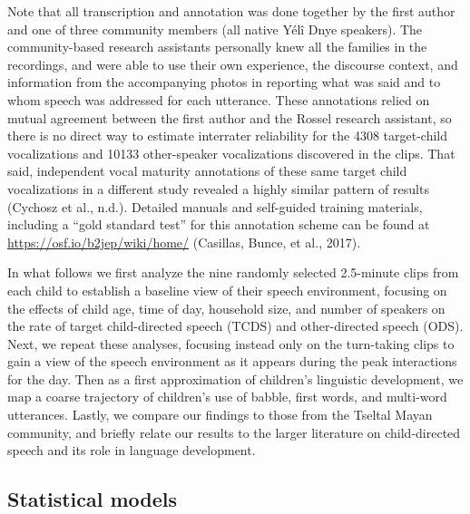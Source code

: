 \documentclass[
  english,
  ,man,floatsintext]{apa6}
\begin{document}
Note that all transcription and annotation was done together by the first author and one of three community members (all native Yélî Dnye speakers). The community-based research assistants personally knew all the families in the recordings, and were able to use their own experience, the discourse context, and information from the accompanying photos in reporting what was said and to whom speech was addressed for each utterance. These annotations relied on mutual agreement between the first author and the Rossel research assistant, so there is no direct way to estimate interrater reliability for the 4308 target-child vocalizations and 10133 other-speaker vocalizations discovered in the clips. That said, independent vocal maturity annotations of these same target child vocalizations in a different study revealed a highly similar pattern of results (Cychosz et al., n.d.). Detailed manuals and self-guided training materials, including a \enquote{gold standard test} for this annotation scheme can be found at \url{https://osf.io/b2jep/wiki/home/} (Casillas, Bunce, et al., 2017).

In what follows we first analyze the nine randomly selected 2.5-minute clips from each child to establish a baseline view of their speech environment, focusing on the effects of child age, time of day, household size, and number of speakers on the rate of target child-directed speech (TCDS) and other-directed speech (ODS). Next, we repeat these analyses, focusing instead only on the turn-taking clips to gain a view of the speech environment as it appears during the peak interactions for the day. Then as a first approximation of children's linguistic development, we map a coarse trajectory of children's use of babble, first words, and multi-word utterances. Lastly, we compare our findings to those from the Tseltal Mayan community, and briefly relate our results to the larger literature on child-directed speech and its role in language development.

\hypertarget{statistical-models}{%
\subsection{Statistical models}\label{statistical-models}}
\end{document}
